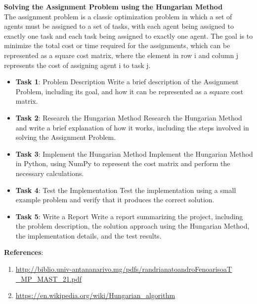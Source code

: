 \question
{\center \bf Solving the Assignment Problem using the Hungarian Method\\}
The assignment problem is a classic optimization problem in which a set
of agents must be assigned to a set of tasks, with each agent being
assigned to exactly one task and each task being assigned to exactly one
agent. The goal is to minimize the total cost or time required for the
assignments, which can be represented as a square cost matrix, where the
element in row i and column j represents the cost of assigning agent i
to task j.

\begin{itemize}
\item
  \textbf{Task 1}: Problem Description Write a brief description of the
  Assignment Problem, including its goal, and how it can be represented
  as a square cost matrix.
\item
  \textbf{Task 2}: Research the Hungarian Method Research the Hungarian
  Method and write a brief explanation of how it works, including the
  steps involved in solving the Assignment Problem.
\item
  \textbf{Task 3}: Implement the Hungarian Method Implement the
  Hungarian Method in Python, using NumPy to represent the cost matrix
  and perform the necessary calculations.
\item
  \textbf{Task 4}: Test the Implementation Test the implementation using
  a small example problem and verify that it produces the correct
  solution.
\item
  \textbf{Task 5}: Write a Report Write a report summarizing the
  project, including the problem description, the solution approach
  using the Hungarian Method, the implementation details, and the test
  results.
\end{itemize}

\textbf{References}:

\begin{enumerate}

\item
  \href{http://biblio.univ-antananarivo.mg/pdfs/randrianatoandroFenoarisoaT\_MP\_MAST\_21.pdf}{http://biblio.univ-antananarivo.mg/pdfs/randrianatoandroFenoarisoaT\\\_MP\_MAST\_21.pdf}
\item
  \href{https://en.wikipedia.org/wiki/Hungarian\_algorithm}{https://en.wikipedia.org/wiki/Hungarian\_algorithm}
\end{enumerate}
